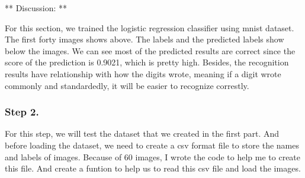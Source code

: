\documentclass[11pt]{article}
\begin{document}
    ** Discussion: **

For this section, we trained the logistic regression classifier using
mnist dataset. The first forty images shows above. The labels and the
predicted labels show below the images. We can see most of the predicted
results are correct since the score of the prediction is 0.9021, which
is pretty high. Besides, the recognition results have relationship with
how the digits wrote, meaning if a digit wrote commonly and
standardedly, it will be easier to recognize correstly.

    \subsubsection{\texorpdfstring{\textbf{Step
2.}}{Step 2.}}\label{step-2.}

For this step, we will test the dataset that we created in the first
part. And before loading the dataset, we need to create a csv format
file to store the names and labels of images. Because of 60 images, I
wrote the code to help me to create this file. And create a funtion to
help us to read this csv file and load the images.
\end{document}
